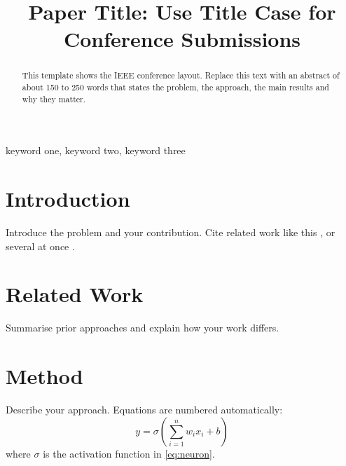 \documentclass[conference]{IEEEtran}
\begin{document}
\title{Paper Title: Use Title Case for\\Conference Submissions}

\author{
\and
{}
}

\maketitle

\begin{abstract}
This template shows the IEEE conference layout. Replace this text with an abstract of about 150 to 250 words that states the problem, the approach, the main results and why they matter.
\end{abstract}

\begin{IEEEkeywords}
keyword one, keyword two, keyword three
\end{IEEEkeywords}

\section{Introduction}
Introduce the problem and your contribution. Cite related work like this \cite{b1}, or several at once \cite{b2, b3}.

\section{Related Work}
Summarise prior approaches and explain how your work differs.

\section{Method}
Describe your approach. Equations are numbered automatically:
\begin{equation}
    y = \sigma\left( \sum_{i=1}^{n} w_i x_i + b \right) \label{eq:neuron}
\end{equation}
where $\sigma$ is the activation function in \eqref{eq:neuron}.
\end{document}
